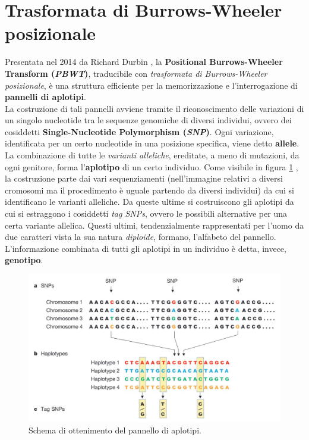 \section{Trasformata di Burrows-Wheeler posizionale}
\label{secpbwt}
Presentata nel 2014 da Richard Durbin \cite{pbwt}, la \textbf{Positional
  Burrows-Wheeler Transform (\textit{PBWT})}, traducibile con
\textit{trasformata di Burrows-Wheeler posizionale}, è una struttura efficiente
per la memorizzazione e l'interrogazione di \textbf{pannelli di aplotipi}.\\
La costruzione di tali pannelli avviene tramite il riconoscimento delle
variazioni di un singolo nucleotide tra le sequenze genomiche di diversi
individui, ovvero dei cosiddetti \textbf{Single-Nucleotide Polymorphism
  (\textit{SNP})}. Ogni variazione, identificata per un certo nucleotide in una
posizione specifica, viene 
detto \textbf{allele}. La combinazione di tutte le \textit{varianti alleliche},
ereditate, a meno di mutazioni, da ogni genitore, forma l'\textbf{aplotipo} di
un certo individuo. Come visibile in figura \ref{fig:haplo} \cite{haplo}, la 
costruzione parte dai
vari sequenziamenti (nell'immagine relativi a diversi cromosomi ma il
procedimento è uguale partendo da diversi individui) da cui si identificano le
varianti alleliche. Da queste ultime si costruiscono gli aplotipi da cui si
estraggono i cosiddetti \textit{tag SNPs}, ovvero le possibili alternative per
una certa variante allelica. Questi ultimi, tendenzialmente rappresentati per
l'uomo da due caratteri vista la sua natura \textit{diploide}, formano,
l'alfabeto del pannello. 
L’informazione combinata di tutti gli aplotipi in un individuo è detta,
invece, \textbf{genotipo}.
\begin{figure}
  \centering
  \includegraphics[scale = 0.3]{img/haplo.jpg}
  \caption{Schema di ottenimento del pannello di aplotipi.}
  \label{fig:haplo}
\end{figure}
